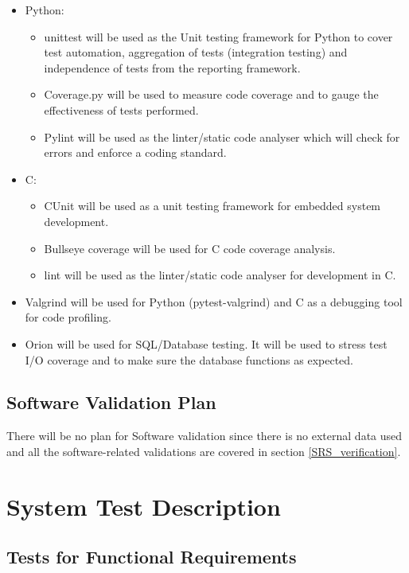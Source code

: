 \documentclass[12pt, titlepage]{article}
\begin{document}
\begin{itemize}
  \item Python:
        \begin{itemize}
          \item unittest will be used as the Unit testing framework for Python to cover test automation, aggregation of tests (integration 							testing) and independence of tests from the reporting framework.
          \item Coverage.py will be used to measure code coverage and to gauge the effectiveness of tests performed.
          \item Pylint will be used as the linter/static code analyser which will check for errors and enforce a coding standard.
        \end{itemize}
  \item C:
        \begin{itemize}
          \item CUnit will be used as a unit testing framework for embedded system development.
          \item Bullseye coverage will be used for C code coverage analysis.
          \item lint will be used as the linter/static code analyser for development in C.
        \end{itemize}
  \item Valgrind will be used for Python (pytest-valgrind) and C as a debugging tool for code profiling.
  \item Orion will be used for SQL/Database testing. It will be used to stress test I/O coverage and to make sure the database functions as expected.
\end{itemize}

\subsection{Software Validation Plan}

There will be no plan for Software validation since there is no external data used and all the software-related validations are covered in  section \ref{SRS_verification}.

\section{System Test Description}

\subsection{Tests for Functional Requirements}\label{sec_5_1}
\end{document}
